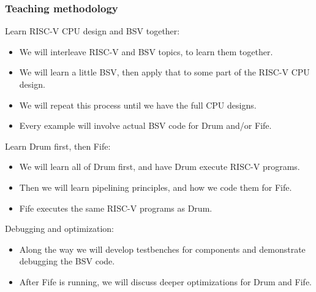 \begin{frame}
\frametitle{Teaching methodology}

Learn RISC-V CPU design and BSV together:

\begin{itemize}
\item We will interleave RISC-V and BSV topics, to learn them together.
\item We will learn a little BSV, then apply that to some part of the RISC-V CPU design.
\item We will repeat this process until we have the full CPU designs.
\item Every example will involve actual BSV code for Drum and/or Fife.
\end{itemize}

\vspace{1ex}

Learn Drum first, then Fife:

\begin{itemize}
\item We will learn all of Drum first, and have Drum execute RISC-V programs.
\item Then we will learn pipelining principles, and how we code them for Fife.
\item Fife executes the same RISC-V programs as Drum.
\end{itemize}

\vspace{1ex}

Debugging and optimization:

\begin{itemize}

\item Along the way we will develop testbenches for components and
      demonstrate debugging the BSV code.

\item After Fife is running, we will discuss deeper optimizations for Drum and Fife.
\end{itemize}

\end{frame}



